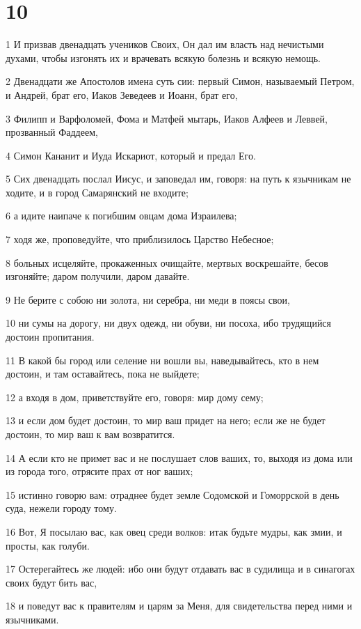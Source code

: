 \chapter{10}

\par 1 И призвав двенадцать учеников Своих, Он дал им власть над нечистыми духами, чтобы изгонять их и врачевать всякую болезнь и всякую немощь.
\par 2 Двенадцати же Апостолов имена суть сии: первый Симон, называемый Петром, и Андрей, брат его, Иаков Зеведеев и Иоанн, брат его,
\par 3 Филипп и Варфоломей, Фома и Матфей мытарь, Иаков Алфеев и Леввей, прозванный Фаддеем,
\par 4 Симон Кананит и Иуда Искариот, который и предал Его.
\par 5 Сих двенадцать послал Иисус, и заповедал им, говоря: на путь к язычникам не ходите, и в город Самарянский не входите;
\par 6 а идите наипаче к погибшим овцам дома Израилева;
\par 7 ходя же, проповедуйте, что приблизилось Царство Небесное;
\par 8 больных исцеляйте, прокаженных очищайте, мертвых воскрешайте, бесов изгоняйте; даром получили, даром давайте.
\par 9 Не берите с собою ни золота, ни серебра, ни меди в поясы свои,
\par 10 ни сумы на дорогу, ни двух одежд, ни обуви, ни посоха, ибо трудящийся достоин пропитания.
\par 11 В какой бы город или селение ни вошли вы, наведывайтесь, кто в нем достоин, и там оставайтесь, пока не выйдете;
\par 12 а входя в дом, приветствуйте его, говоря: мир дому сему;
\par 13 и если дом будет достоин, то мир ваш придет на него; если же не будет достоин, то мир ваш к вам возвратится.
\par 14 А если кто не примет вас и не послушает слов ваших, то, выходя из дома или из города того, отрясите прах от ног ваших;
\par 15 истинно говорю вам: отраднее будет земле Содомской и Гоморрской в день суда, нежели городу тому.
\par 16 Вот, Я посылаю вас, как овец среди волков: итак будьте мудры, как змии, и просты, как голуби.
\par 17 Остерегайтесь же людей: ибо они будут отдавать вас в судилища и в синагогах своих будут бить вас,
\par 18 и поведут вас к правителям и царям за Меня, для свидетельства перед ними и язычниками.
